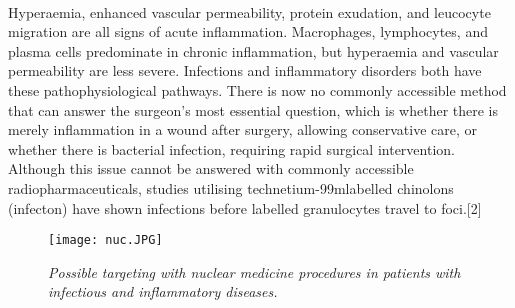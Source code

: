 \documentclass[12pt]{article}
\begin{document}
\\Hyperaemia, enhanced vascular permeability, protein exudation, and leucocyte migration are all signs of acute inflammation. Macrophages, lymphocytes, and plasma cells predominate in chronic inflammation, but hyperaemia and vascular permeability are less severe. Infections and inflammatory disorders both have these pathophysiological pathways. There is now no commonly accessible method that can answer the surgeon's most essential question, which is whether there is merely inflammation in a wound after surgery, allowing conservative care, or whether there is bacterial infection, requiring rapid surgical intervention. Although this issue cannot be answered with commonly accessible radiopharmaceuticals, studies utilising technetium-99mlabelled chinolons (infecton) have shown infections before labelled granulocytes travel to foci.[2]
\begin{figure}[htp]
    \centering
    \texttt{[image: nuc.JPG]}
    \caption{\textit{ Possible targeting with nuclear medicine procedures in patients with infectious and inflammatory diseases.}}
    \label{Figure}
\end{figure}
\end{document}
